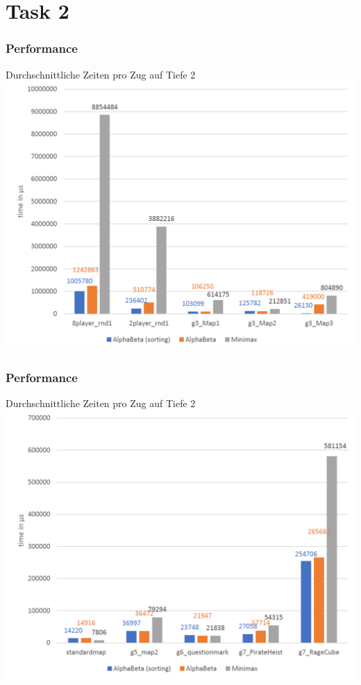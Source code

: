 \documentclass{beamer}
\begin{document}
\section{Task 2}

\begin{frame}
\frametitle{Performance}
  \begin{center}
    Durchschnittliche Zeiten pro Zug auf Tiefe 2    
    \includegraphics[scale=0.35]{Depth_2_2_avgtime}
  \end{center}
  

\end{frame}

  \begin{frame}
\frametitle{Performance}
  \begin{center}
    Durchschnittliche Zeiten pro Zug auf Tiefe 2    
    \includegraphics[scale=0.35]{Depth_2_1_avgtime}
  \end{center}
  \end{frame}
\end{document}
